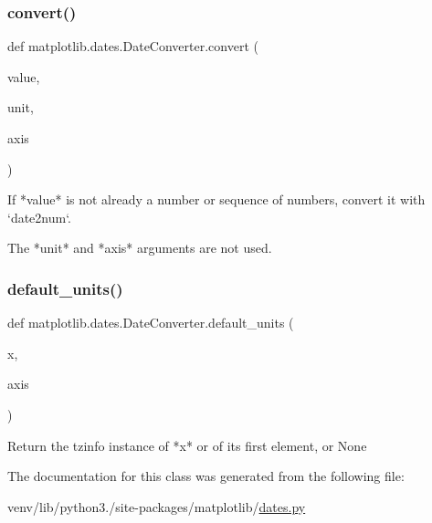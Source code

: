 \subsubsection{\texorpdfstring{convert()}{convert()}}
{\footnotesize\ttfamily def matplotlib.\+dates.\+Date\+Converter.\+convert (\begin{DoxyParamCaption}\item[{}]{value,  }\item[{}]{unit,  }\item[{}]{axis }\end{DoxyParamCaption})\hspace{0.3cm}{\ttfamily [static]}}

\begin{DoxyVerb}If *value* is not already a number or sequence of numbers, convert it
with `date2num`.

The *unit* and *axis* arguments are not used.
\end{DoxyVerb}
 \mbox{\label{classmatplotlib_1_1dates_1_1DateConverter_a5aee58e254b88faee5deddcc1ff756e9}} 
\subsubsection{\texorpdfstring{default\+\_\+units()}{default\_units()}}
{\footnotesize\ttfamily def matplotlib.\+dates.\+Date\+Converter.\+default\+\_\+units (\begin{DoxyParamCaption}\item[{}]{x,  }\item[{}]{axis }\end{DoxyParamCaption})\hspace{0.3cm}{\ttfamily [static]}}

\begin{DoxyVerb}Return the tzinfo instance of *x* or of its first element, or None
\end{DoxyVerb}
 

The documentation for this class was generated from the following file\+:\begin{DoxyCompactItemize}
\item 
venv/lib/python3./site-\/packages/matplotlib/\hyperlink{dates_8py}{dates.\+py}\end{DoxyCompactItemize}
